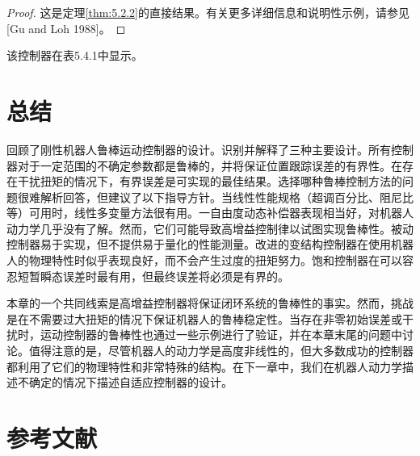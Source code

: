 \documentclass[UTF8,12pt,a4paper]{ctexart}
\begin{document}
\begin{proof}
这是定理\ref{thm:5.2.2}的直接结果。有关更多详细信息和说明性示例，请参见[Gu and Loh 1988]。
\end{proof}

该控制器在表5.4.1中显示。

\section{总结}

回顾了刚性机器人鲁棒运动控制器的设计。识别并解释了三种主要设计。所有控制器对于一定范围的不确定参数都是鲁棒的，并将保证位置跟踪误差的有界性。在存在干扰扭矩的情况下，有界误差是可实现的最佳结果。选择哪种鲁棒控制方法的问题很难解析回答，但建议了以下指导方针。当线性性能规格（超调百分比、阻尼比等）可用时，线性多变量方法很有用。一自由度动态补偿器表现相当好，对机器人动力学几乎没有了解。然而，它们可能导致高增益控制律以试图实现鲁棒性。被动控制器易于实现，但不提供易于量化的性能测量。改进的变结构控制器在使用机器人的物理特性时似乎表现良好，而不会产生过度的扭矩努力。饱和控制器在可以容忍短暂瞬态误差时最有用，但最终误差将必须是有界的。

本章的一个共同线索是高增益控制器将保证闭环系统的鲁棒性的事实。然而，挑战是在不需要过大扭矩的情况下保证机器人的鲁棒稳定性。当存在非零初始误差或干扰时，运动控制器的鲁棒性也通过一些示例进行了验证，并在本章末尾的问题中讨论。值得注意的是，尽管机器人的动力学是高度非线性的，但大多数成功的控制器都利用了它们的物理特性和非常特殊的结构。在下一章中，我们在机器人动力学描述不确定的情况下描述自适应控制器的设计。

\section*{参考文献}
\end{document}

